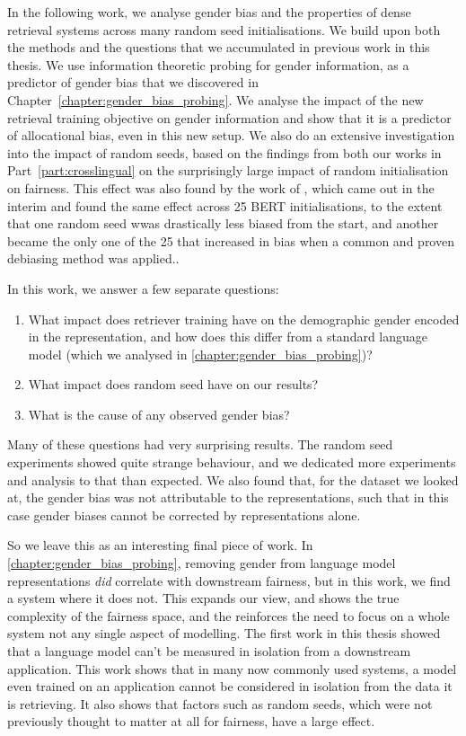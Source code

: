 In the following work, we analyse gender bias and the properties of dense retrieval systems across many random seed initialisations. We build upon both the methods and the questions that we accumulated in previous work in this thesis. We use information theoretic probing for gender information, as a predictor of gender bias that we discovered in Chapter~\ref{chapter:gender_bias_probing}. We analyse the impact of the new retrieval training objective on gender information and show that it is a predictor of allocational bias, even in this new setup. We also do an extensive investigation into the impact of random seeds, based on the findings from both our works in Part~\ref{part:crosslingual} on the surprisingly large impact of random initialisation on fairness. This effect was also found by the work of \citet{multiberts}, which came out in the interim and found the same effect across 25 BERT initialisations, to the extent that one random seed wwas drastically less biased from the start, and another became the only one of the 25 that increased in bias when a common and proven debiasing method was applied..

In this work, we answer a few separate questions:
\begin{enumerate}
    \item What impact does retriever training have on the demographic gender encoded in the representation, and how does this differ from a standard language model (which we analysed in \ref{chapter:gender_bias_probing})?
    \item What impact does random seed have on our results?
    \item What is the cause of any observed gender bias?
\end{enumerate}

Many of these questions had very surprising results. The random seed experiments showed quite strange behaviour, and we dedicated more experiments and analysis to that than expected. We also found that, for the dataset we looked at, the gender bias was not attributable to the representations, such that in this case gender biases cannot be corrected by representations alone. 

So we leave this as an interesting final piece of work. In \ref{chapter:gender_bias_probing}, removing gender from language model representations \textit{did} correlate with downstream fairness, but in this work, we find a system where it does not. This expands our view, and shows the true complexity of the fairness space, and the reinforces the need to focus on a whole system not any single aspect of modelling. The first work in this thesis showed that a language model can't be measured in isolation from a downstream application. This work shows that in many now commonly used systems, a model even trained on an application cannot be considered in isolation from the data it is retrieving. It also shows that factors such as random seeds, which were not previously thought to matter at all for fairness, have a large effect. 




